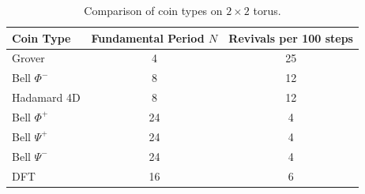 \begin{table}[H]
\centering
\caption{Comparison of coin types on $2 \times 2$ torus.}
\label{tab:all-coins}
\begin{tabular}{lcc}
\toprule
\textbf{Coin Type} & \textbf{Fundamental Period $N$} & \textbf{Revivals per 100 steps} \\
\midrule
Grover & 4 & 25 \\
Bell $\Phi^-$ & 8 & 12 \\
Hadamard 4D & 8 & 12 \\
Bell $\Phi^+$ & 24 & 4 \\
Bell $\Psi^+$ & 24 & 4 \\
Bell $\Psi^-$ & 24 & 4 \\
DFT & 16 & 6 \\
\bottomrule
\end{tabular}
\end{table}
